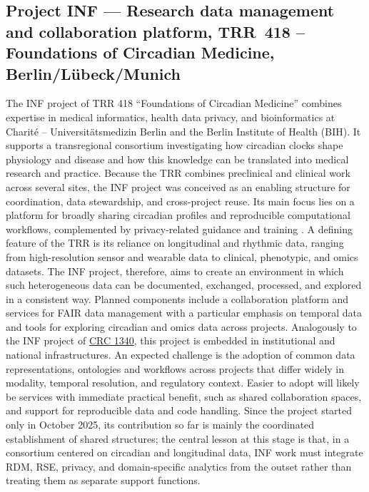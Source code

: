 \documentclass{eceasst}
\begin{document}
\subsection{Project INF --- Research data management and collaboration platform, TRR~418 -- Foundations of Circadian Medicine, Berlin/Lübeck/Munich}
The INF project of TRR 418 “Foundations of Circadian Medicine” combines expertise in medical informatics, health data privacy, and bioinformatics at Charité – Universitätsmedizin Berlin and the Berlin Institute of Health (BIH).
It supports a transregional consortium investigating how circadian clocks shape physiology and disease and how this knowledge can be translated into medical research and practice. Because the TRR combines preclinical and clinical work across several sites, the INF project was conceived as an enabling structure for coordination, data stewardship, and cross-project reuse. Its main focus lies on a platform for broadly sharing circadian profiles and reproducible computational workflows, complemented by privacy-related guidance and training \cite{baum_data_circadian_2023}.
A defining feature of the TRR is its reliance on longitudinal and rhythmic data, ranging from high-resolution sensor and wearable data to clinical, phenotypic, and omics datasets.
The INF project, therefore, aims to create an environment in which such heterogeneous data can be documented, exchanged, processed, and explored in a consistent way. Planned components include a collaboration platform and services for FAIR data management with a particular emphasis on temporal data and tools for exploring circadian and omics data across projects.
Analogously to the INF project of \hyperref[sec:sfb1340]{CRC 1340}, this project is embedded in institutional and national infrastructures. An expected challenge is the adoption of common data representations, ontologies and workflows across projects that differ widely in modality, temporal resolution, and regulatory context. Easier to adopt will likely be services with immediate practical benefit, such as shared collaboration spaces, and support for reproducible data and code handling.
Since the project started only in October 2025, its contribution so far is mainly the coordinated establishment of shared structures; the central lesson at this stage is that, in a consortium centered on circadian and longitudinal data, INF work must integrate RDM, RSE, privacy, and domain-specific analytics from the outset rather than treating them as separate support functions.
\end{document}
